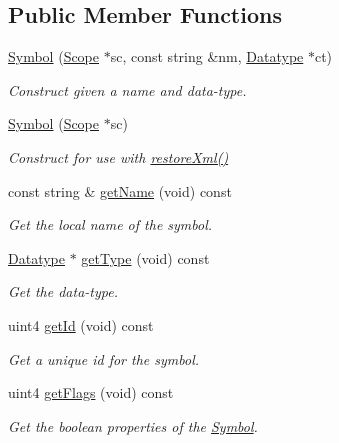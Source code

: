 \subsection*{Public Member Functions}
\begin{DoxyCompactItemize}
\item 
\mbox{\hyperlink{class_symbol_a5188e6395f982732c218279809b92a8e}{Symbol}} (\mbox{\hyperlink{class_scope}{Scope}} $\ast$sc, const string \&nm, \mbox{\hyperlink{class_datatype}{Datatype}} $\ast$ct)
\begin{DoxyCompactList}\small\item\em Construct given a name and data-\/type. \end{DoxyCompactList}\item 
\mbox{\hyperlink{class_symbol_a133463e4ef55968c58bd483ab683a0c1}{Symbol}} (\mbox{\hyperlink{class_scope}{Scope}} $\ast$sc)
\begin{DoxyCompactList}\small\item\em Construct for use with \mbox{\hyperlink{class_symbol_a3266a5752c208bdfa5a28e792de67604}{restore\+Xml()}} \end{DoxyCompactList}\item 
const string \& \mbox{\hyperlink{class_symbol_a09581886eebb89084c4e1e20c2517784}{get\+Name}} (void) const
\begin{DoxyCompactList}\small\item\em Get the local name of the symbol. \end{DoxyCompactList}\item 
\mbox{\hyperlink{class_datatype}{Datatype}} $\ast$ \mbox{\hyperlink{class_symbol_adc3b41817547e9b7d3379d43da912e2b}{get\+Type}} (void) const
\begin{DoxyCompactList}\small\item\em Get the data-\/type. \end{DoxyCompactList}\item 
uint4 \mbox{\hyperlink{class_symbol_a3bba6e7c23431123ff45f90d25617a3b}{get\+Id}} (void) const
\begin{DoxyCompactList}\small\item\em Get a unique id for the symbol. \end{DoxyCompactList}\item 
uint4 \mbox{\hyperlink{class_symbol_a89e604eeb814081ced6355fda04cc931}{get\+Flags}} (void) const
\begin{DoxyCompactList}\small\item\em Get the boolean properties of the \mbox{\hyperlink{class_symbol}{Symbol}}. \end{DoxyCompactList}\item 

\end{DoxyCompactItemize}
